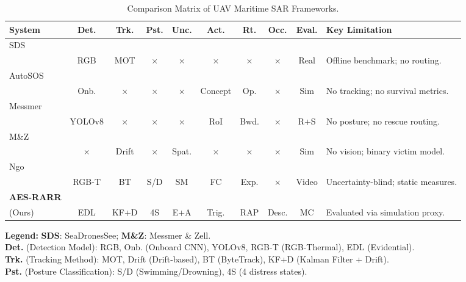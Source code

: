 \documentclass[11pt,a4paper]{article}
\begin{document}
\begin{table}[t!]
\centering
\caption{Comparison Matrix of UAV Maritime SAR Frameworks.}
\label{tab:comparison}
\small
\setlength{\tabcolsep}{3.5pt}
\renewcommand{\arraystretch}{1.1}
\begin{tabularx}{\textwidth}{@{} L{1.0} C{0.7} C{0.7} C{0.6} C{0.8} C{0.7} C{0.8} C{0.6} C{0.7} L{3.4} @{}}
\toprule
\textbf{System} & \textbf{Det.} & \textbf{Trk.} & \textbf{Pst.} & \textbf{Unc.} & \textbf{Act.} & \textbf{Rt.} & \textbf{Occ.} & \textbf{Eval.} & \textbf{Key Limitation} \\
\midrule
SDS \\ \cite{ref3} 
  & RGB 
  & MOT 
  & $\times$ 
  & $\times$ 
  & $\times$ 
  & $\times$ 
  & $\times$ 
  & Real 
  & Offline benchmark; no routing. \\
\addlinespace
AutoSOS \\ \cite{ref11} 
  & Onb. 
  & $\times$ 
  & $\times$ 
  & $\times$ 
  & Concept 
  & Op. 
  & $\times$ 
  & Sim 
  & No tracking; no survival metrics. \\
\addlinespace
Messmer \\ \cite{ref5} 
  & YOLOv8 
  & $\times$ 
  & $\times$ 
  & $\times$ 
  & RoI 
  & Bwd. 
  & $\times$ 
  & R+S 
  & No posture; no rescue routing. \\
\addlinespace
M\&Z \\ \cite{ref12} 
  & $\times$ 
  & Drift 
  & $\times$ 
  & Spat. 
  & $\times$ 
  & $\times$ 
  & $\times$ 
  & Sim 
  & No vision; binary victim model. \\
\addlinespace
Ngo \\ \cite{ref4} 
  & RGB-T 
  & BT 
  & S/D 
  & SM 
  & FC 
  & Exp. 
  & $\times$ 
  & Video 
  & Uncertainty-blind; static measures. \\
\midrule
\textbf{AES-RARR} \\ (Ours) 
  & EDL 
  & KF+D 
  & 4S 
  & E+A 
  & Trig. 
  & RAP 
  & Desc. 
  & MC 
  & Evaluated via simulation proxy. \\
\bottomrule
\end{tabularx}
\smallskip
\scriptsize
\textbf{Legend:} 
\textbf{SDS}: SeaDronesSee; \textbf{M\&Z}: Messmer \& Zell. \\
\textbf{Det.} (Detection Model): RGB, Onb. (Onboard CNN), YOLOv8, RGB-T (RGB-Thermal), EDL (Evidential). \\
\textbf{Trk.} (Tracking Method): MOT, Drift (Drift-based), BT (ByteTrack), KF+D (Kalman Filter + Drift). \\
\textbf{Pst.} (Posture Classification): S/D (Swimming/Drowning), 4S (4 distress states). \\

\end{table}
\end{document}
